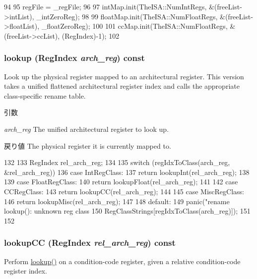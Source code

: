 \begin{DoxyCode}
94 {
95     regFile = _regFile;
96 
97     intMap.init(TheISA::NumIntRegs, &(freeList->intList), _intZeroReg);
98 
99     floatMap.init(TheISA::NumFloatRegs, &(freeList->floatList), _floatZeroReg);
100 
101     ccMap.init(TheISA::NumFloatRegs, &(freeList->ccList), (RegIndex)-1);
102 }
\end{DoxyCode}
\hypertarget{classUnifiedRenameMap_a149269d2ce2fbf7e13ec91a5647bf170}{
\subsubsection[{lookup}]{ lookup ({\bf RegIndex} {\em arch\_\-reg}) const}}
\label{classUnifiedRenameMap_a149269d2ce2fbf7e13ec91a5647bf170}
Look up the physical register mapped to an architectural register. This version takes a unified flattened architectural register index and calls the appropriate class-\/specific rename table. 
\begin{DoxyParams}{引数}
\item[{\em arch\_\-reg}]The unified architectural register to look up. \end{DoxyParams}
\begin{DoxyReturn}{戻り値}
The physical register it is currently mapped to. 
\end{DoxyReturn}



\begin{DoxyCode}
132 {
133     RegIndex rel_arch_reg;
134 
135     switch (regIdxToClass(arch_reg, &rel_arch_reg)) {
136       case IntRegClass:
137         return lookupInt(rel_arch_reg);
138 
139       case FloatRegClass:
140         return lookupFloat(rel_arch_reg);
141 
142       case CCRegClass:
143         return lookupCC(rel_arch_reg);
144 
145       case MiscRegClass:
146         return lookupMisc(rel_arch_reg);
147 
148       default:
149         panic("rename lookup(): unknown reg class %
150               RegClassStrings[regIdxToClass(arch_reg)]);
151     }
152 }
\end{DoxyCode}
\hypertarget{classUnifiedRenameMap_a8ce66153601d299656186b221fc1b264}{
\subsubsection[{lookupCC}]{ lookupCC ({\bf RegIndex} {\em rel\_\-arch\_\-reg}) const}}
\label{classUnifiedRenameMap_a8ce66153601d299656186b221fc1b264}
Perform \hyperlink{classUnifiedRenameMap_a149269d2ce2fbf7e13ec91a5647bf170}{lookup()} on a condition-\/code register, given a relative condition-\/code register index. 


